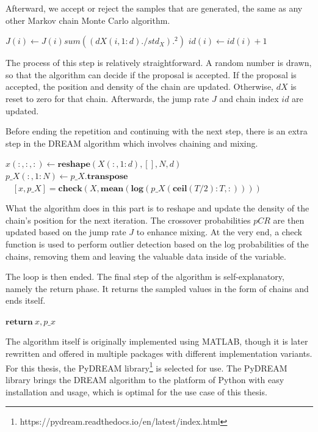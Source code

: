 Afterward, we accept or reject the samples that are generated, the same as any other Markov chain Monte Carlo algorithm.

\begin{algorithm}[H]
$J(i) \gets J(i) sum((dX(i, 1:d) ./ std_X).^2)$
$id(i) \gets id(i) + 1$
\end{algorithm}

The process of this step is relatively straightforward. A random number is drawn, so that the algorithm can decide if the proposal is accepted. If the proposal is accepted, the position and density of the chain are updated. Otherwise, $dX$ is reset to zero for that chain. Afterwards, the jump rate $J$ and chain index $id$ are updated.

Before ending the repetition and continuing with the next step, there is an extra step in the DREAM algorithm which involves chaining and mixing.

\begin{algorithm}[H]
$x(:, :, :) \gets \textbf{reshape}(X(:, 1:d), [], N, d)$\\
$p\_X(:, 1:N) \gets p\_X.\textbf{transpose}$\\\
$[x, p\_X] = \textbf{check}(X, \textbf{mean}(\textbf{log}(p\_X(\textbf{ceil}(T/2):T, :))))$
\end{algorithm}
What the algorithm does in this part is to reshape and update the density of the chain's position for the next iteration. The crossover probabilities $pCR$ are then updated based on the jump rate $J$ to enhance mixing. At the very end, a check function is used to perform outlier detection based on the log probabilities of the chains, removing them and leaving the valuable data inside of the variable.

The loop is then ended. The final step of the algorithm is self-explanatory, namely the return phase. It returns the sampled values in the form of chains and ends itself.
\begin{algorithm}
    $\textbf{return}\  x, p\_x$
\end{algorithm}

The algorithm itself is originally implemented using MATLAB, though it is later rewritten and offered in multiple packages with different implementation variants. For this thesis, the PyDREAM library\footnote{https://pydream.readthedocs.io/en/latest/index.html} is selected for use. The PyDREAM library brings the DREAM algorithm to the platform of Python with easy installation and usage,\cite{pydream} which is optimal for the use case of this thesis.

